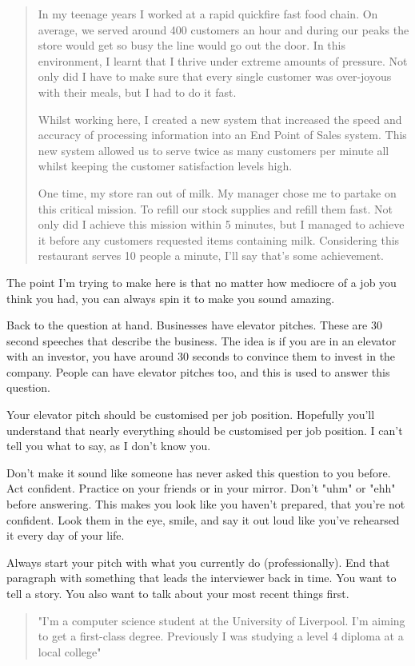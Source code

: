 \documentclass{article}
\begin{document}
\begin{quote}
In my teenage years I worked at a rapid quickfire fast food chain. On
average, we served around 400 customers an hour and during our peaks the
store would get so busy the line would go out the door. In this
environment, I learnt that I thrive under extreme amounts of pressure.
Not only did I have to make sure that every single customer was
over-joyous with their meals, but I had to do it fast.

Whilst working here, I created a new system that increased the speed and
accuracy of processing information into an End Point of Sales system.
This new system allowed us to serve twice as many customers per minute
all whilst keeping the customer satisfaction levels high.

One time, my store ran out of milk. My manager chose me to partake on
this critical mission. To refill our stock supplies and refill them
fast. Not only did I achieve this mission within 5 minutes, but I
managed to achieve it before any customers requested items containing
milk. Considering this restaurant serves 10 people a minute, I'll say
that's some achievement.
\end{quote}

The point I'm trying to make here is that no matter how mediocre of a
job you think you had, you can always spin it to make you sound amazing.

Back to the question at hand. Businesses have elevator pitches. These
are 30 second speeches that describe the business. The idea is if you
are in an elevator with an investor, you have around 30 seconds to
convince them to invest in the company. People can have elevator pitches
too, and this is used to answer this question.

Your elevator pitch should be customised per job position. Hopefully
you'll understand that nearly everything should be customised per job
position. I can't tell you what to say, as I don't know you.

Don't make it sound like someone has never asked this question to you
before. Act confident. Practice on your friends or in your mirror. Don't
"uhm" or "ehh" before answering. This makes you look like you haven't
prepared, that you're not confident. Look them in the eye, smile, and
say it out loud like you've rehearsed it every day of your life.

Always start your pitch with what you currently do (professionally). End
that paragraph with something that leads the interviewer back in time.
You want to tell a story. You also want to talk about your most recent
things first.
\begin{quote}
"I'm a computer science student at the University of Liverpool. I'm
aiming to get a first-class degree. Previously I was studying a level 4
diploma at a local college"
\end{quote}
\end{document}
